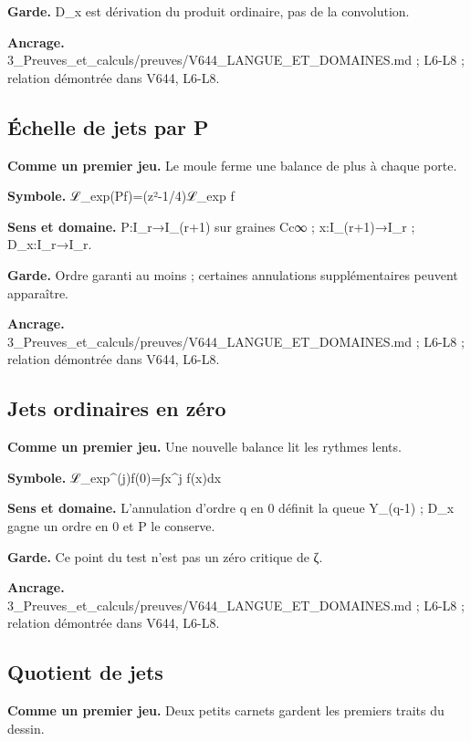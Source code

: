 \documentclass[
  9pt,
  a4paper,
]{article}
\begin{document}
\textbf{Garde.} D\_x est dérivation du produit ordinaire, pas de la
convolution.

\textbf{Ancrage.}
3\_Preuves\_et\_calculs/preuves/V644\_LANGUE\_ET\_DOMAINES.md ; L6-L8 ;
relation démontrée dans V644, L6-L8.

\hypertarget{uxe9chelle-de-jets-par-p}{%
\subsection{Échelle de jets par P}\label{uxe9chelle-de-jets-par-p}}

\textbf{Comme un premier jeu.} Le moule ferme une balance de plus à
chaque porte.

\textbf{Symbole.} ℒ\_exp(Pf)=(z²-1/4)ℒ\_exp f

\textbf{Sens et domaine.} P:I\_r→I\_(r+1) sur graines Cc∞ ;
x:I\_(r+1)→I\_r ; D\_x:I\_r→I\_r.

\textbf{Garde.} Ordre garanti au moins ; certaines annulations
supplémentaires peuvent apparaître.

\textbf{Ancrage.}
3\_Preuves\_et\_calculs/preuves/V644\_LANGUE\_ET\_DOMAINES.md ; L6-L8 ;
relation démontrée dans V644, L6-L8.

\hypertarget{jets-ordinaires-en-zuxe9ro}{%
\subsection{Jets ordinaires en zéro}\label{jets-ordinaires-en-zuxe9ro}}

\textbf{Comme un premier jeu.} Une nouvelle balance lit les rythmes
lents.

\textbf{Symbole.} ℒ\_exp\^{}(j)f(0)=∫x\^{}j f(x)dx

\textbf{Sens et domaine.} L'annulation d'ordre q en 0 définit la queue
Y\_(q-1) ; D\_x gagne un ordre en 0 et P le conserve.

\textbf{Garde.} Ce point du test n'est pas un zéro critique de ζ.

\textbf{Ancrage.}
3\_Preuves\_et\_calculs/preuves/V644\_LANGUE\_ET\_DOMAINES.md ; L6-L8 ;
relation démontrée dans V644, L6-L8.

\hypertarget{quotient-de-jets}{%
\subsection{Quotient de jets}\label{quotient-de-jets}}

\textbf{Comme un premier jeu.} Deux petits carnets gardent les premiers
traits du dessin.
\end{document}
